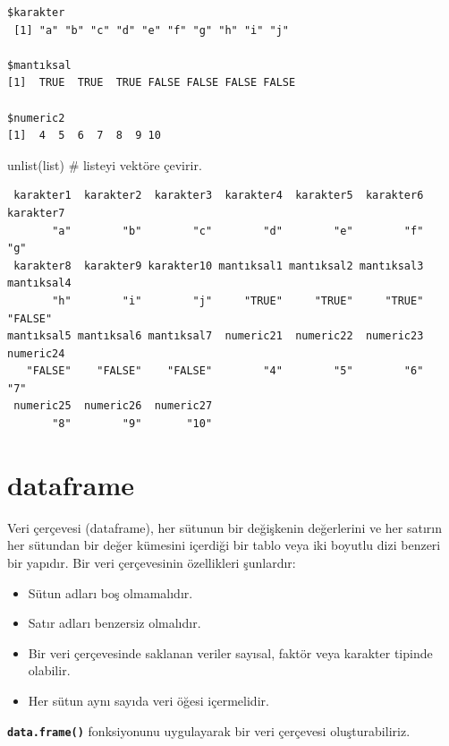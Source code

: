 \documentclass[
  letterpaper,
  DIV=11,
  numbers=noendperiod]{scrreprt}
\newenvironment{Shaded}{\begin{snugshade}}{\end{snugshade}}
\newcommand{\CommentTok}[1]{\textcolor[rgb]{0.37,0.37,0.37}{#1}}
\newcommand{\FunctionTok}[1]{\textcolor[rgb]{0.28,0.35,0.67}{#1}}
\newcommand{\NormalTok}[1]{\textcolor[rgb]{0.00,0.23,0.31}{#1}}
\begin{document}
\begin{verbatim}
$karakter
 [1] "a" "b" "c" "d" "e" "f" "g" "h" "i" "j"

$mantıksal
[1]  TRUE  TRUE  TRUE FALSE FALSE FALSE FALSE

$numeric2
[1]  4  5  6  7  8  9 10
\end{verbatim}

\begin{Shaded}
\begin{Highlighting}[]
\FunctionTok{unlist}\NormalTok{(list) }\CommentTok{\# listeyi vektöre çevirir.}
\end{Highlighting}
\end{Shaded}

\begin{verbatim}
 karakter1  karakter2  karakter3  karakter4  karakter5  karakter6  karakter7 
       "a"        "b"        "c"        "d"        "e"        "f"        "g" 
 karakter8  karakter9 karakter10 mantıksal1 mantıksal2 mantıksal3 mantıksal4 
       "h"        "i"        "j"     "TRUE"     "TRUE"     "TRUE"    "FALSE" 
mantıksal5 mantıksal6 mantıksal7  numeric21  numeric22  numeric23  numeric24 
   "FALSE"    "FALSE"    "FALSE"        "4"        "5"        "6"        "7" 
 numeric25  numeric26  numeric27 
       "8"        "9"       "10" 
\end{verbatim}

\hypertarget{dataframe}{%
\section{dataframe}\label{dataframe}}

Veri çerçevesi (dataframe), her sütunun bir değişkenin değerlerini ve
her satırın her sütundan bir değer kümesini içerdiği bir tablo veya iki
boyutlu dizi benzeri bir yapıdır. Bir veri çerçevesinin özellikleri
şunlardır:

\begin{itemize}
\item
  Sütun adları boş olmamalıdır.
\item
  Satır adları benzersiz olmalıdır.
\item
  Bir veri çerçevesinde saklanan veriler sayısal, faktör veya karakter
  tipinde olabilir.
\item
  Her sütun aynı sayıda veri öğesi içermelidir.
\end{itemize}

\textbf{\texttt{data.frame()}} fonksiyonunu uygulayarak bir veri
çerçevesi oluşturabiliriz.
\end{document}
